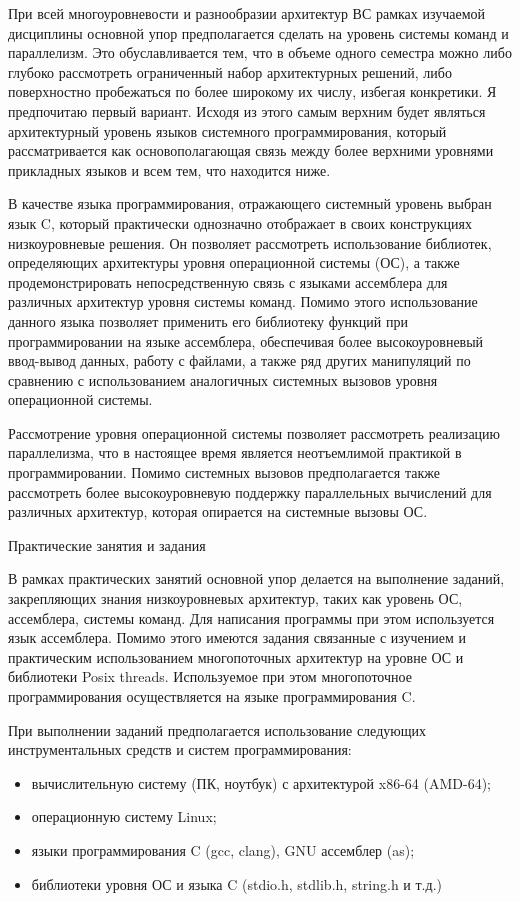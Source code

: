 При всей многоуровневости и разнообразии архитектур ВС рамках изучаемой дисциплины основной упор предполагается сделать на уровень системы команд и параллелизм. Это обуславливается тем, что в объеме одного семестра можно либо глубоко рассмотреть ограниченный набор архитектурных решений, либо поверхностно пробежаться по более широкому их числу, избегая конкретики. Я предпочитаю первый вариант. Исходя из этого самым верхним будет являться архитектурный уровень языков системного программирования, который рассматривается как основополагающая связь между более верхними уровнями прикладных языков и всем тем, что находится ниже.

В качестве языка программирования, отражающего системный уровень выбран язык C, который практически однозначно отображает в своих конструкциях низкоуровневые решения. Он позволяет рассмотреть использование библиотек, определяющих архитектуры уровня операционной системы (ОС), а также продемонстрировать непосредственную связь с языками ассемблера для различных архитектур уровня системы команд. Помимо этого использование данного языка позволяет применить его библиотеку функций при программировании на языке ассемблера, обеспечивая более высокоуровневый ввод-вывод данных, работу с файлами, а также ряд других манипуляций по сравнению с использованием аналогичных системных вызовов уровня операционной системы.

Рассмотрение уровня операционной системы позволяет рассмотреть реализацию параллелизма, что в настоящее время является неотъемлимой практикой в программировании. Помимо системных вызовов предполагается также рассмотреть более высокоуровневую поддержку параллельных вычислений для различных архитектур, которая опирается на системные вызовы ОС.


Практические занятия и задания

В рамках практических занятий основной упор делается на выполнение заданий, закрепляющих знания низкоуровневых архитектур, таких как уровень ОС, ассемблера, системы команд. Для написания программы при этом используется язык ассемблера. Помимо этого имеются задания связанные с изучением и практическим использованием многопоточных архитектур на уровне ОС и библиотеки Posix threads. Используемое при этом многопоточное программирования осуществляется на языке программирования C.

При выполнении заданий предполагается использование следующих инструментальных средств и систем программирования:

\begin{itemize}
 \item вычислительную систему (ПК, ноутбук) с архитектурой x86-64 (AMD-64);
\item операционную систему Linux;
\item языки программирования C (gcc, clang), GNU ассемблер (as);
\item библиотеки уровня ОС и языка C (stdio.h, stdlib.h, string.h и т.д.)
\end{itemize}


